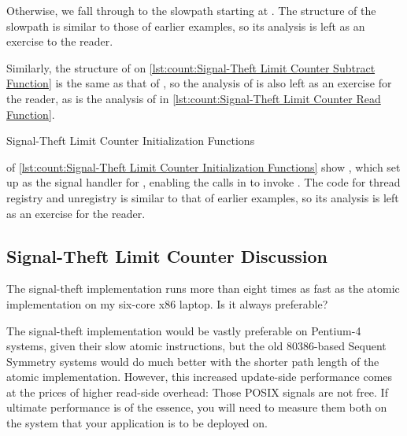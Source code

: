\begin{fcvref}
Otherwise, we fall through to the slowpath starting at .
The structure of the slowpath is similar to those of earlier examples,
so its analysis is left as an exercise to the reader.
\end{fcvref}
Similarly, the structure of  on
\cref{lst:count:Signal-Theft Limit Counter Subtract Function}
is the same
as that of , so the analysis of  is also
left as an exercise for the reader, as is the analysis of
 in
\cref{lst:count:Signal-Theft Limit Counter Read Function}.

\begin{listing}

\caption{Signal-Theft Limit Counter Initialization Functions}
\label{lst:count:Signal-Theft Limit Counter Initialization Functions}
\end{listing}

\begin{fcvref}
 of
\cref{lst:count:Signal-Theft Limit Counter Initialization Functions}
show , which set up 
as the signal handler for ,
enabling the  calls in 
to invoke .
The code for thread registry and unregistry is similar to that of
earlier examples, so its analysis is left as an exercise for the
reader.
\end{fcvref}

\subsection{Signal-Theft Limit Counter Discussion}

The signal-theft implementation runs more than eight times as fast as the
atomic implementation on my six-core x86 laptop.
Is it always preferable?

The signal-theft implementation would be vastly preferable on Pentium-4
systems, given their slow atomic instructions, but the old 80386-based
Sequent Symmetry systems would do much better with the shorter path
length of the atomic implementation.
However, this increased update-side performance comes at the
prices of higher read-side overhead:
Those POSIX signals are not free.
If ultimate performance is of the essence, you will need to measure
them both on the system that your application is to be deployed on.


